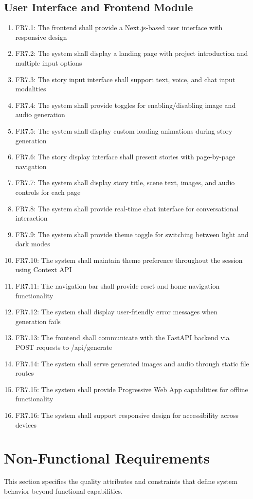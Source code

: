 \subsection{User Interface and Frontend Module}
\begin{enumerate}
    \item FR7.1: The frontend shall provide a Next.js-based user interface with responsive design
    \item FR7.2: The system shall display a landing page with project introduction and multiple input options
    \item FR7.3: The story input interface shall support text, voice, and chat input modalities
    \item FR7.4: The system shall provide toggles for enabling/disabling image and audio generation
    \item FR7.5: The system shall display custom loading animations during story generation
    \item FR7.6: The story display interface shall present stories with page-by-page navigation
    \item FR7.7: The system shall display story title, scene text, images, and audio controls for each page
    \item FR7.8: The system shall provide real-time chat interface for conversational interaction
    \item FR7.9: The system shall provide theme toggle for switching between light and dark modes
    \item FR7.10: The system shall maintain theme preference throughout the session using Context API
    \item FR7.11: The navigation bar shall provide reset and home navigation functionality
    \item FR7.12: The system shall display user-friendly error messages when generation fails
    \item FR7.13: The frontend shall communicate with the FastAPI backend via POST requests to /api/generate
    \item FR7.14: The system shall serve generated images and audio through static file routes
    \item FR7.15: The system shall provide Progressive Web App capabilities for offline functionality
    \item FR7.16: The system shall support responsive design for accessibility across devices
\end{enumerate}

\section{Non-Functional Requirements}
This section specifies the quality attributes and constraints that define system behavior beyond functional capabilities.

